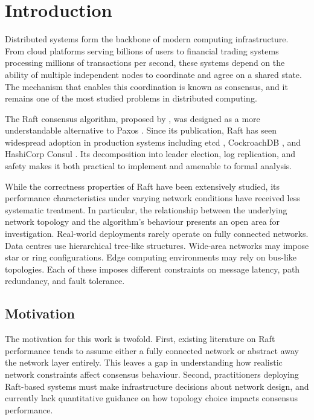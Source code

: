 \chapter{Introduction}
\label{ch:introduction}

Distributed systems form the backbone of modern computing infrastructure. From cloud platforms serving billions of users to financial trading systems processing millions of transactions per second, these systems depend on the ability of multiple independent nodes to coordinate and agree on a shared state. The mechanism that enables this coordination is known as consensus, and it remains one of the most studied problems in distributed computing.

The Raft consensus algorithm, proposed by \citet{ongaro2014}, was designed as a more understandable alternative to Paxos \citep{lamport1998}. Since its publication, Raft has seen widespread adoption in production systems including etcd \citep{etcd2024}, CockroachDB \citep{cockroachdb2024}, and HashiCorp Consul \citep{consul2024}. Its decomposition into leader election, log replication, and safety makes it both practical to implement and amenable to formal analysis.

While the correctness properties of Raft have been extensively studied, its performance characteristics under varying network conditions have received less systematic treatment. In particular, the relationship between the underlying network topology and the algorithm's behaviour presents an open area for investigation. Real-world deployments rarely operate on fully connected networks. Data centres use hierarchical tree-like structures. Wide-area networks may impose star or ring configurations. Edge computing environments may rely on bus-like topologies. Each of these imposes different constraints on message latency, path redundancy, and fault tolerance.

\section{Motivation}

The motivation for this work is twofold. First, existing literature on Raft performance tends to assume either a fully connected network or abstract away the network layer entirely. This leaves a gap in understanding how realistic network constraints affect consensus behaviour. Second, practitioners deploying Raft-based systems must make infrastructure decisions about network design, and currently lack quantitative guidance on how topology choice impacts consensus performance.

